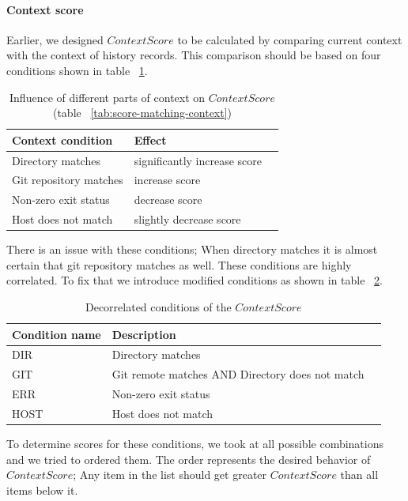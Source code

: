 \documentclass[thesis=M,english]{FITthesis}[2012/10/20]
\let\myRef\ref
\renewcommand\ref{\unskip~\myRef}
\begin{document}
\paragraph{Context score}

Earlier, we designed \(ContextScore\) to be calculated by comparing current context with the context of history records. This comparison should be based on four conditions shown in table \ref{tab:copy-of-score-matching-context}.

\begin{table}[h!]
\centering
\begin{tabular}{lll}
\hline \hline
Context condition       & Effect \\
\hline
Directory matches      & significantly increase score \\ 
Git repository matches & increase score \\ 
Non-zero exit status   & decrease score \\
Host does not match    & slightly decrease score \\ 
\hline \hline
\end{tabular}
\caption{Influence of different parts of context on \(ContextScore\) (table \ref{tab:score-matching-context})}
\label{tab:copy-of-score-matching-context}
\end{table}


There is an issue with these conditions; When directory matches it is almost certain that git repository matches as well. These conditions are highly correlated.
To fix that we introduce modified conditions as shown in table \ref{tab:score-context-impl-decorrelated}.

\begin{table}[h!]
\centering
\begin{tabular}{lll}
\hline \hline
Condition name & Description \\
\hline
DIR         & Directory matches \\ 
GIT         & Git remote matches AND Directory does not match\\ 
ERR         & Non-zero exit status \\
HOST        & Host does not match \\ 
\hline \hline
\end{tabular}
\caption{Decorrelated conditions of the \(ContextScore\)}
\label{tab:score-context-impl-decorrelated}
\end{table}

To determine scores for these conditions, we took at all possible combinations and we tried to ordered them. The order represents the desired behavior of \(ContextScore\); Any item in the list should get greater \(ContextScore\) than all items below it.
\end{document}

